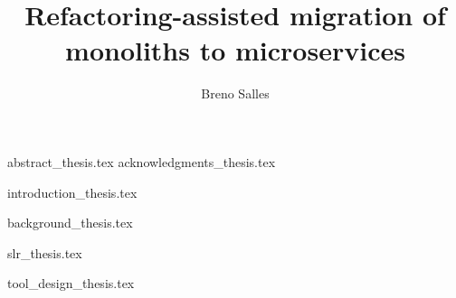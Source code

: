 \documentclass[11pt,a4paper]{report}
\begin{document}
\title{Refactoring-assisted migration of monoliths to microservices}
\author{Breno Salles}










\begin{Prolog}
  {abstract_thesis.tex}
  {acknowledgments_thesis.tex}
  \cleardoublepage
  \tableofcontents
  \cleardoublepage
  \listoffigures
  \cleardoublepage
  \listoftables
  \cleardoublepage
\end{Prolog}

\StartBody

{introduction_thesis.tex}

{background_thesis.tex}

{slr_thesis.tex}

{tool_design_thesis.tex}
\end{document}
